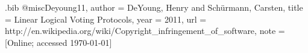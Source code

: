 \begin{filecontents*}{\jobname.bib}
@misc{Deyoung11,
	author 	= {DeYoung, Henry and Sch{\"u}rmann, Carsten},
	title 		= {{L}inear {L}ogical {V}oting {P}rotocols},
	year 		= {2011},
	url 		= {http://en.wikipedia.org/wiki/Copyright\_infringement\_of\_software},
	note 		= {[Online; accessed \today]}
}
\end{filecontents*}

